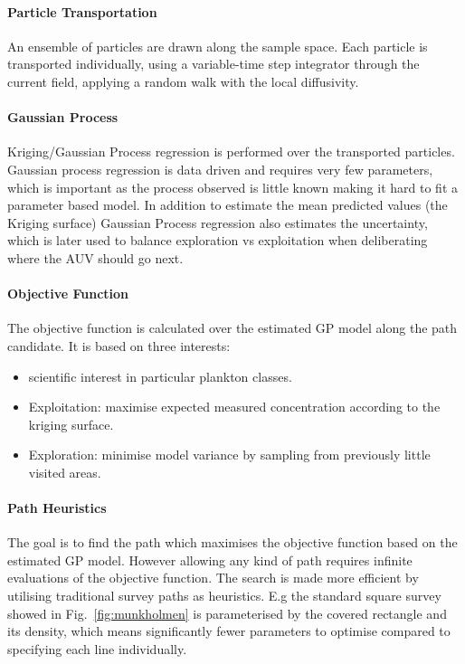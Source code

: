 \documentclass[conference]{IEEEtran}
\begin{document}
\paragraph{Particle Transportation}
An ensemble of particles are drawn along the sample space.  
Each particle is transported individually, using a variable-time step integrator through the current field, applying a random walk with the local diffusivity.

\paragraph{Gaussian Process}
Kriging/Gaussian Process regression is performed over the transported particles.
Gaussian process regression is data driven and requires very few parameters, which is important as the process observed is little known making it hard to fit a parameter based model.
In addition to estimate the mean predicted values (the Kriging surface) Gaussian Process regression also estimates the uncertainty, which is later used to balance exploration vs exploitation when deliberating where the AUV should go next.

\paragraph{Objective Function}
The objective function is calculated over the estimated GP model along the path candidate.
It is based on three interests:
\begin{itemize}
    \item scientific interest in particular plankton classes.
    \item Exploitation: maximise expected measured concentration according to the kriging surface.
    \item Exploration: minimise model variance by sampling from previously little visited areas.
\end{itemize}



\paragraph{Path Heuristics}
The goal is to find the path which maximises the objective function based on the estimated GP model.
However allowing any kind of path requires infinite evaluations of the objective function.
The search is made more efficient by utilising traditional survey paths as heuristics. E.g the standard square survey showed in Fig.~\ref{fig:munkholmen} is parameterised by the covered rectangle and its density, which means significantly fewer parameters to optimise compared to specifying each line individually. 
\end{document}
